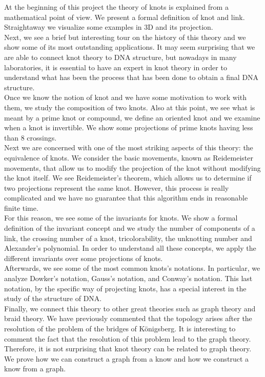 At the beginning of this project the theory of knots is explained from a mathematical point of view. We present a formal definition of knot and link.  Straightaway we visualize some examples in 3D and its projection.\\


Next, we see a brief but interesting tour on the history of this theory and we show some of its most outstanding applications. It may seem surprising that we are able to connect knot theory to DNA structure, but nowadays in many laboratories, it is essential to have an expert in knot theory in order to understand what has been the process that has been done to obtain a final DNA structure.\\


Once we know the notion of knot and we have some motivation to work with them, we study the composition of two knots. Also at this point, we see what is meant by a prime knot or compound, we define an oriented knot and we examine when a knot is invertible. We show some projections of prime knots having less than 8 crossings.\\


Next we are concerned with one of the most striking aspects of this theory: the equivalence of knots. We consider the basic movements, known as Reidemeister movements, that allow us to modify the projection of the knot without modifying the knot itself. We see Reidemeister's theorem, which allows us to determine if two projections represent the same knot. However, this process is really complicated and we have no guarantee that this algorithm ends in reasonable finite time.\\


For this reason, we see some of the invariants for knots. We show a formal definition of the invariant concept and we study the number of components of a link, the crossing number of a knot, tricolorability, the unknotting number and Alexander's polynomial. In order to understand all these concepts, we apply the different invariants over some projections of knots.\\ 


Afterwards, we see some of the most common knots’s notations. In particular, we analyze Dowker's notation, Gauss's notation, and Conway's notation. This last notation, by the specific way of projecting knots, has a special interest in the study of the structure of DNA.\\


Finally, we connect this theory to other great theories such as graph theory and braid theory. We have previously commented that the topology arises after the resolution of the problem of the bridges of Königsberg. It is interesting to comment the fact that the resolution of this problem lead to the graph theory. Therefore, it is not surprising that knot theory can be related to graph theory. We prove how we can construct a graph from a know and how we construct a know from a graph.\\


